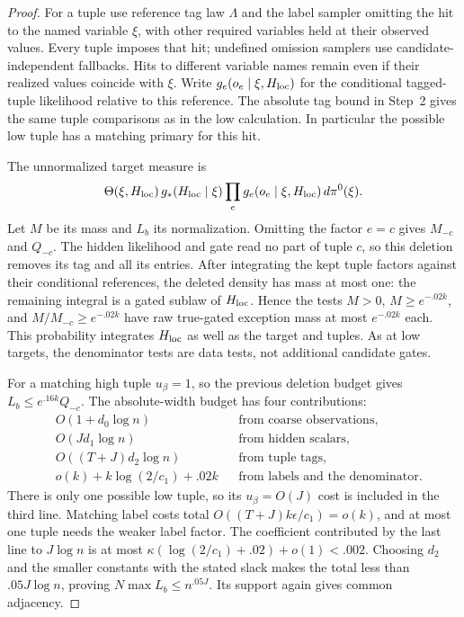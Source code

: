 \begin{proof}
For a tuple use reference tag law \(\Lambda\) and the label sampler
omitting the hit to the named variable \(\xi\), with other required
variables held at their observed values. Every tuple imposes that hit;
undefined omission samplers use candidate-independent fallbacks.
Hits to different variable names remain even if their realized values
coincide with \(\xi\). Write \(g_e(o_e\mid\xi,H_{\rm loc})\) for
the conditional tagged-tuple likelihood relative to this reference.
The absolute tag bound in Step~2 gives the same tuple comparisons as in
the low calculation. In particular the possible low tuple has a matching
primary for this hit.

The unnormalized target measure is
\[
 \Theta(\xi,H_{\rm loc})\,g_*(H_{\rm loc}\mid\xi)
 \prod_e g_e(o_e\mid\xi,H_{\rm loc})\,d\pi^0(\xi).
\]
Let \(M\) be its mass and \(L_b\) its normalization. Omitting the
factor \(e=c\) gives \(M_{-c}\) and \(Q_{-c}\).
The hidden likelihood and gate read no part of tuple \(c\), so this
deletion removes its tag and all its entries. After integrating the kept
tuple factors against their conditional references, the deleted density
has mass at most one: the remaining integral is a gated sublaw of
\(H_{\rm loc}\). Hence the tests \(M>0\), \(M\ge e^{-.02k}\), and
\(M/M_{-c}\ge e^{-.02k}\) have raw true-gated exception mass at most
\(e^{-.02k}\) each. This probability integrates \(H_{\rm loc}\) as
well as the target and tuples. As at low targets, the denominator tests
are data tests, not additional candidate gates.

For a matching high tuple \(u_\beta=1\), so the previous deletion
budget gives \(L_b\le e^{.16k}Q_{-c}\). The absolute-width budget has
four contributions:
\[
 \begin{aligned}
 &O(1+d_0\log n) &&\text{from coarse observations},\\
 &O(Jd_1\log n) &&\text{from hidden scalars},\\
 &O((T+J)d_2\log n) &&\text{from tuple tags},\\
 &o(k)+k\log(2/c_1)+.02k &&\text{from labels and the denominator}.
 \end{aligned}
\]
There is only one possible low tuple, so its \(u_\beta=O(J)\) cost is
included in the third line. Matching label costs total
\(O((T+J)k\epsilon/c_1)=o(k)\), and at most one tuple needs the weaker
label factor. The coefficient contributed by the last line to
\(J\log n\) is at most
\(\kappa(\log(2/c_1)+.02)+o(1)<.002\).
Choosing \(d_2\) and the smaller constants with the stated slack makes
the total less than \(.05J\log n\), proving
\(N\max L_b\le n^{.05J}\). Its support again gives common adjacency.


\end{proof}
